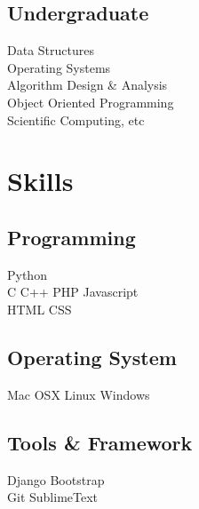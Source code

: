 \documentclass[]{deedy-resume-openfont}
\begin{document}
\begin{minipage}[t]{0.33\textwidth}
{%


\subsection{Undergraduate}
Data Structures \\
Operating Systems \\
Algorithm Design \& Analysis \\
Object Oriented Programming \\
Scientific Computing, etc \\
\sectionsep


\section{Skills}
\subsection{Programming}
Python \\
C \textbullet{} C++ \textbullet{} PHP \textbullet{} Javascript \\ HTML \textbullet{} CSS \textbullet{} \\
\subsection{Operating System}
Mac OSX \textbullet{} Linux \textbullet{} Windows
\subsection{Tools \& Framework}
Django \textbullet{} Bootstrap \\
Git \textbullet SublimeText
\sectionsep

}
\end{minipage}
\end{document}
